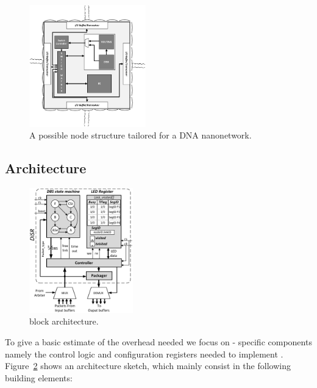 \begin{figure}
  \centering
  \includegraphics[width=0.45\textwidth]{pictures/node_structure.eps}
  \caption{A possible node structure tailored for a DNA nanonetwork.}
 \label{fig:node_structure}
\end{figure}
\subsection{\disr{} Architecture}
\label{ssec:disr_architecture}

\begin{figure}
  \centering
  \includegraphics[width=0.40\textwidth]{pictures/disr_rtl_updated.eps}
  \caption{\emph{\disr{}} block architecture.}
 \label{fig:implementation}
\end{figure}

To give a basic estimate of the overhead needed we focus on \disr{}-
specific components namely the control logic and configuration
registers needed to implement \disr{}. Figure~\ref{fig:implementation}
shows an architecture sketch, which mainly consist in the
following building elements:

